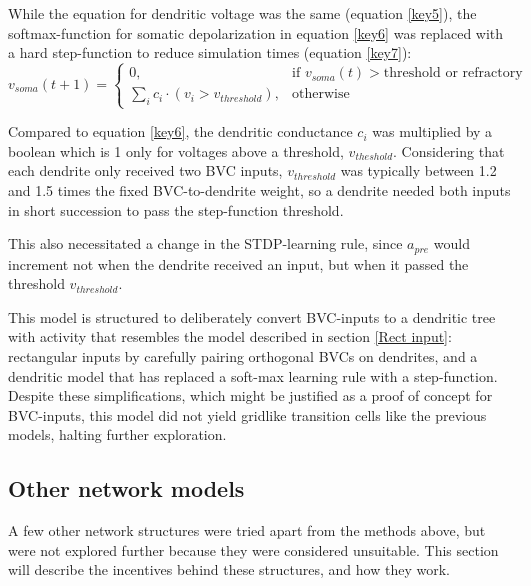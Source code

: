 \documentclass{article}
\begin{document}
    While the equation for dendritic voltage was the same (equation \ref{key5}), the softmax-function for somatic depolarization in equation \ref{key6} was replaced with a hard step-function to reduce simulation times (equation \ref{key7}):
    \begin{equation}\label{key7} v_{soma}(t + 1) = \begin{cases} 0, & \text{if } v_{soma}(t) > \text{threshold or refractory}\\
        \sum_{i}^{} c_i \cdot (v_i > v_{threshold}), & \text{otherwise} \end{cases}\end{equation} 
    
    Compared to equation \ref{key6}, the dendritic conductance \(c_i\) was multiplied by a boolean which is 1 only for voltages above a threshold, \(v_{theshold}\). Considering that each dendrite only received two BVC inputs, \(v_{threshold}\) was typically between 1.2 and 1.5 times the fixed BVC-to-dendrite weight, so a dendrite needed both inputs in short succession to pass the step-function threshold.

    This also necessitated a change in the STDP-learning rule, since \(a_{pre}\) would increment not when the dendrite received an input, but when it passed the threshold \(v_{threshold}\).

    This model is structured to deliberately convert BVC-inputs to a dendritic tree with activity that resembles the model described in section \ref{Rect input}: rectangular inputs by carefully pairing orthogonal BVCs on dendrites, and a dendritic model that has replaced a soft-max learning rule with a step-function. Despite these simplifications, which might be justified as a proof of concept for BVC-inputs, this model did not yield gridlike transition cells like the previous models, halting further exploration.

    \subsection{Other network models} \label{Other Models}

    A few other network structures were tried apart from the methods above, but were not explored further because they were considered unsuitable. This section will describe the incentives behind these structures, and how they work.
\end{document}
